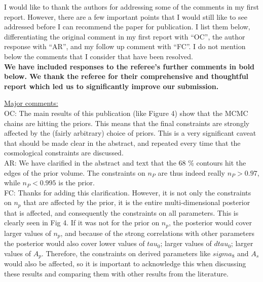 \documentclass[12pt]{article}
\begin{document}
\onehalfspacing

I would like to thank the authors for addressing some of the comments in my first report.
However, there are a few important points that I would still like to see addressed before I can recommend the paper for publication.
I list them below, differentiating the original comment in my first report with “OC”, the author response with “AR”, and my follow up comment with “FC”.
I do not mention below the comments that I consider that have been resolved.\\

\textbf{We have included responses to the referee's further comments in bold below. We thank the referee for their comprehensive and thoughtful report which led us to significantly improve our submission.}\\

\hrulefill \newline

\underline{Major comments:}\\

OC: The main results of this publication (like Figure 4) show that the MCMC chains are hitting the priors. This means that the final constraints are strongly affected by the (fairly arbitrary) choice of priors. This is a very significant caveat that should be made clear in the abstract, and repeated every time that the cosmological constraints are discussed.\\

AR: We have clarified in the abstract and text that the 68 \% contours hit the edges of the prior volume. The constraints on $n_P$ are thus indeed really $n_P > 0.97$, while $n_P < 0.995$ is the prior.\\

FC: Thanks for adding this clarification. However, it is not only the constraints on $n_p$ that are affected by the prior, it is the entire multi-dimensional posterior that is affected, and consequently the constraints on all parameters. This is clearly seen in Fig 4. If it was not for the prior on $n_p$, the posterior would cover larger values of $n_p$, and because of the strong correlations with other parameters the posterior would also cover lower values of $tau_0$; larger values of $dtau_0$; larger values of $A_p$. Therefore, the constraints on derived parameters like $sigma_8$ and $A_s$ would also be affected, so it is important to acknowledge this when discussing these results and comparing them with other results from the literature.\\
\end{document}

